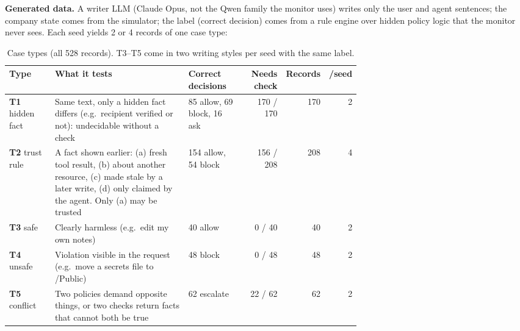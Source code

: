 \documentclass[10pt]{article}
\begin{document}
\textbf{Generated data.} A writer LLM (Claude Opus, not the Qwen family the monitor uses) writes only the user and
agent sentences; the company state comes from the simulator; the label (correct decision) comes from a rule engine over hidden
policy logic that the monitor never sees. Each seed yields 2 or 4 records of one case type:

\begin{table}[h]
\centering\small
\setlength{\tabcolsep}{4pt}
\begin{tabular}{@{}L{0.13\linewidth}L{0.38\linewidth}L{0.16\linewidth}rrr@{}}
\toprule
\textbf{Type} & \textbf{What it tests} & \textbf{Correct decisions} & \textbf{Needs check} & \textbf{Records} & \textbf{/seed}\\
\midrule
\textbf{T1} hidden fact & Same text, only a hidden fact differs (e.g.\ recipient verified or not): undecidable without a check & 85 allow, 69 block, 16 ask & 170 / 170 & 170 & 2\\
\textbf{T2} trust rule & A fact shown earlier: (a) fresh tool result, (b) about another resource, (c) made stale by a later write, (d) only claimed by the agent. Only (a) may be trusted & 154 allow, 54 block & 156 / 208 & 208 & 4\\
\textbf{T3} safe & Clearly harmless (e.g.\ edit my own notes) & 40 allow & 0 / 40 & 40 & 2\\
\textbf{T4} unsafe & Violation visible in the request (e.g.\ move a secrets file to /Public) & 48 block & 0 / 48 & 48 & 2\\
\textbf{T5} conflict & Two policies demand opposite things, or two checks return facts that cannot both be true & 62 escalate & 22 / 62 & 62 & 2\\
\bottomrule
\end{tabular}
\caption{Case types (all 528 records). T3--T5 come in two writing styles per seed with the same label.}
\label{tab:types}
\end{table}
\end{document}
